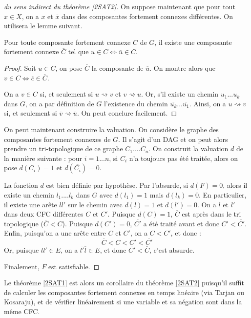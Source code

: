 \begin{proof}[du sens indirect du théorème \ref{2SAT2}]

On suppose maintenant que pour tout $x\in X$, on a $x$ et $\overline{x}$ dans des composantes fortement connexes différentes. On utilisera le lemme suivant.

\begin{lemma}
Pour toute composante fortement connexe $C$ de $G$, il existe une composante fortement connexe $\overline{C}$ tel que $u\in C \Leftrightarrow \overline{u}\in C$.
\end{lemma}

\begin{proof}
Soit $u\in C$, on pose $\overline{C}$ la composante de $\overline{u}$. On montre alors que $v\in C \Leftrightarrow  \overline{c}\in \overline{C}$.

On a $v\in C$ si, et seulement si $u \rightsquigarrow v$ et $v\rightsquigarrow u$. Or, s'il existe un chemin $u_1...u_k$ dans $G$, on a par définition de $G$ l'existence du chemin $\overline{u_k} ...\overline{u_1}$. Ainsi, on a 
$u \rightsquigarrow v$ si, et seulement si $\overline{v} \rightsquigarrow \overline{u}$. On peut conclure facilement.
\end{proof}

On peut maintenant construire la valuation. On considère le graphe des composantes fortement connexes de $G$. Il s'agit d'un DAG et on peut alors prendre un tri-topologique de ce graphe $C_1....C_n$. On construit la valuation $d$ de la manière suivante : pour $i=1...n$, si $C_i$ n'a toujours pas été traitée, alors on pose $d(C_i)=1$ et $d(\overline{C_i})=0$.

La fonction $d$ est bien définie par hypothèse. Par l'absurde, si $d(F)=0$, alors il existe un chemin $l_1....l_k$ dans $G$ avec $d(l_1)=1$ mais $d(l_k)=0$. En particulier, il existe une arête $ll'$ sur le chemin avec $d(l)=1$ et $d(l')=0$. On a $l$ et $l'$ dans deux CFC différentes $C$ et $C'$. Puisque $d(C)=1$, $\overline{C}$ est après dans le tri topologique ($\overline{C} <C$). Puisque $d (C')=0$, $\overline{C'}$ a été traité avant et donc $C'< \overline{C'}$. Enfin, puisqu'on a une arête entre $C$ et $C'$, on a $C<C'$, et donc :
$$
\overline{C} < C < C' < \overline{C'}
$$
Or, puisque $ll'\in E$, on a $\overline{l'}\overline{l}\in E$, et donc $\overline{C'}< \overline{C}$, c'est absurde.

Finalement, $F$ est satisfiable.
\end{proof}


Le théorème \ref{2SAT1} est alors un corollaire du théorème \ref{2SAT2} puisqu'il suffit de calculer les composantes fortement connexes en temps linéaire (via Tarjan ou Kosaraju), et de vérifier linéairement si une variable et sa négation sont dans la même CFC.
